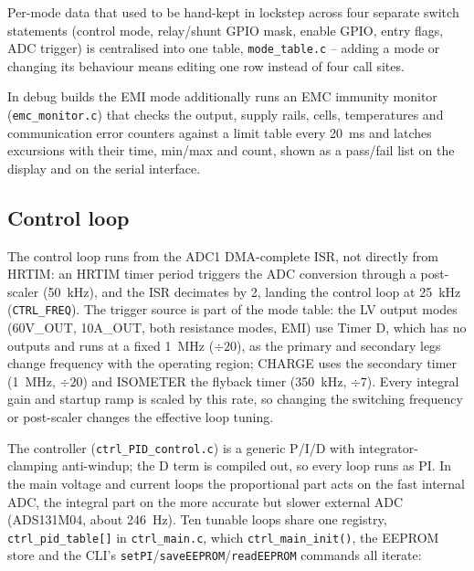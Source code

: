 Per-mode data that used to be hand-kept in lockstep across four separate
switch statements (control mode, relay/shunt \ac{GPIO} mask, enable
\ac{GPIO}, entry flags, \ac{ADC} trigger) is centralised into one table,
\texttt{mode\_table.c} -- adding a mode or changing its behaviour means
editing one row instead of four call sites.

In debug builds the EMI mode additionally runs an EMC immunity monitor
(\texttt{emc\_monitor.c}) that checks the output, supply rails, cells,
temperatures and communication error counters against a limit table every
\qty{20}{\milli\second} and latches excursions with their time, min/max and
count, shown as a pass/fail list on the display and on the serial interface.

\subsection{Control loop}

The control loop runs from the \ac{ADC}1 \ac{DMA}-complete \ac{ISR}, not
directly from \ac{HRTIM}: an \ac{HRTIM} timer period triggers the \ac{ADC}
conversion through a post-scaler (\qty{50}{\kilo\hertz}), and the \ac{ISR}
decimates by 2, landing the control loop at \qty{25}{\kilo\hertz}
(\texttt{CTRL\_FREQ}). The trigger source is part of the mode table: the
LV output modes (60V\_OUT, 10A\_OUT, both resistance modes, EMI) use Timer D,
which has no outputs and runs at a fixed \qty{1}{\mega\hertz} ($\div20$), as
the primary and secondary legs change frequency with the operating region;
CHARGE uses the secondary timer (\qty{1}{\mega\hertz}, $\div20$) and
ISOMETER the flyback timer (\qty{350}{\kilo\hertz}, $\div7$). Every
integral gain and startup ramp is scaled by this rate, so changing the
switching frequency or post-scaler changes the effective loop tuning.

The controller (\texttt{ctrl\_PID\_control.c}) is a generic P/I/D with
integrator-clamping anti-windup; the D term is compiled out, so every loop
runs as PI. In the main voltage and current loops the proportional part acts
on the fast internal \ac{ADC}, the integral part on the more accurate but slower external \ac{ADC}
(ADS131M04, about \qty{246}{\hertz}). Ten tunable loops share one registry,
\texttt{ctrl\_pid\_table[]} in \texttt{ctrl\_main.c}, which
\texttt{ctrl\_main\_init()}, the \ac{EEPROM} store and the \ac{CLI}'s
\texttt{setPI}/\texttt{saveEEPROM}/\texttt{readEEPROM} commands all iterate:

